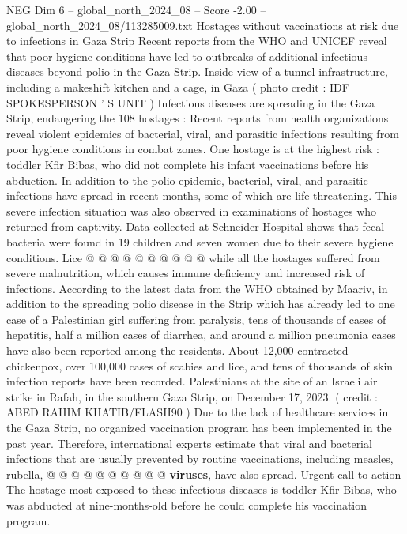 \begin{textsample}{NEG Dim 6 – global\_north\_2024\_08 – Score -2.00 – global\_north\_2024\_08/113285009.txt}  \label{ex:f6_neg_067}
Hostages without vaccinations at risk due to infections in Gaza Strip Recent reports from the WHO and UNICEF reveal that poor hygiene conditions have led to outbreaks of additional infectious diseases beyond polio in the Gaza Strip.
Inside view of a tunnel infrastructure, including a makeshift kitchen and a cage, in Gaza ( photo credit : IDF SPOKESPERSON ' S UNIT ) Infectious diseases are spreading in the Gaza Strip, endangering the 108 hostages : Recent reports from health organizations reveal violent epidemics of bacterial, viral, and parasitic infections resulting from poor hygiene conditions in combat zones.
One hostage is at the highest risk : toddler Kfir Bibas, who did not complete his infant vaccinations before his abduction.
In addition to the polio epidemic, bacterial, viral, and parasitic infections have spread in recent months, some of which are life-threatening.
This severe infection situation was also observed in examinations of hostages who returned from captivity.
Data collected at Schneider Hospital shows that fecal bacteria were found in 19 children and seven women due to their severe hygiene conditions.
Lice @ @ @ @ @ @ @ @ @ @ while all the hostages suffered from severe malnutrition, which causes immune deficiency and increased risk of infections.
According to the latest data from the WHO obtained by Maariv, in addition to the spreading polio disease in the Strip which has already led to one case of a Palestinian girl suffering from paralysis, tens of thousands of cases of hepatitis, half a million cases of diarrhea, and around a million pneumonia cases have also been reported among the residents.
About 12,000 contracted chickenpox, over 100,000 cases of scabies and lice, and tens of thousands of skin infection reports have been recorded.
Palestinians at the site of an Israeli air strike in Rafah, in the southern Gaza Strip, on December 17, 2023. ( credit : ABED RAHIM KHATIB/FLASH90 ) Due to the lack of healthcare services in the Gaza Strip, no organized vaccination program has been implemented in the past year.
Therefore, international experts estimate that viral and bacterial infections that are usually prevented by routine vaccinations, including measles, rubella, @ @ @ @ @ @ @ @ @ @ \textbf{viruses}, have also spread.
Urgent call to action The hostage most exposed to these infectious diseases is toddler Kfir Bibas, who was abducted at nine-months-old before he could complete his vaccination program.

\end{textsample}
